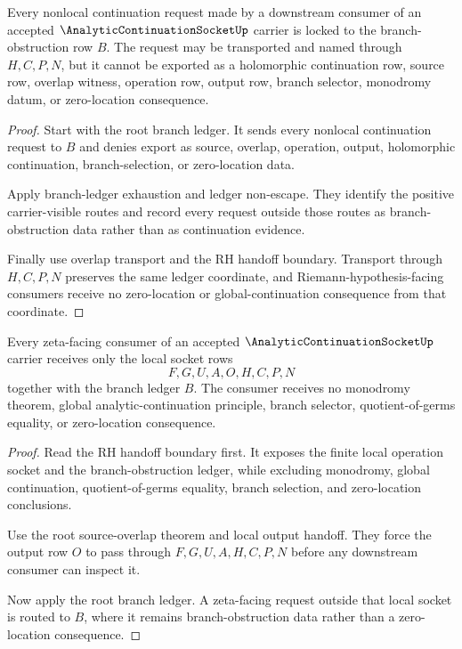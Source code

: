 \begin{theorem}
\label{thm:analytic-continuation-socket-branch-obstruction-consumer-lock}
Every nonlocal continuation request made by a downstream consumer of an
accepted $\AnalyticContinuationSocketUp$ carrier is locked to the
branch-obstruction row $B$. The request may be transported and named through
$H,C,P,N$, but it cannot be exported as a holomorphic continuation row,
source row, overlap witness, operation row, output row, branch selector,
monodromy datum, or zero-location consequence.
\end{theorem}
\begin{proof}
Start with the root branch ledger. It sends every nonlocal continuation
request to $B$ and denies export as source, overlap, operation, output,
holomorphic continuation, branch-selection, or zero-location data.

Apply branch-ledger exhaustion and ledger non-escape. They identify the
positive carrier-visible routes and record every request outside those routes
as branch-obstruction data rather than as continuation evidence.

Finally use overlap transport and the RH handoff boundary. Transport through
$H,C,P,N$ preserves the same ledger coordinate, and Riemann-hypothesis-facing
consumers receive no zero-location or global-continuation consequence from
that coordinate.
\end{proof}

\begin{theorem}
\label{thm:analytic-continuation-socket-zeta-locality-boundary}
Every zeta-facing consumer of an accepted $\AnalyticContinuationSocketUp$
carrier receives only the local socket rows
$$
F,G,U,A,O,H,C,P,N
$$
together with the branch ledger $B$. The consumer receives no monodromy
theorem, global analytic-continuation principle, branch selector,
quotient-of-germs equality, or zero-location consequence.
\end{theorem}
\begin{proof}
Read the RH handoff boundary first. It exposes the finite local operation
socket and the branch-obstruction ledger, while excluding monodromy, global
continuation, quotient-of-germs equality, branch selection, and zero-location
conclusions.

Use the root source-overlap theorem and local output handoff. They force the
output row $O$ to pass through $F,G,U,A,H,C,P,N$ before any downstream
consumer can inspect it.

Now apply the root branch ledger. A zeta-facing request outside that local
socket is routed to $B$, where it remains branch-obstruction data rather than
a zero-location consequence.
\end{proof}

